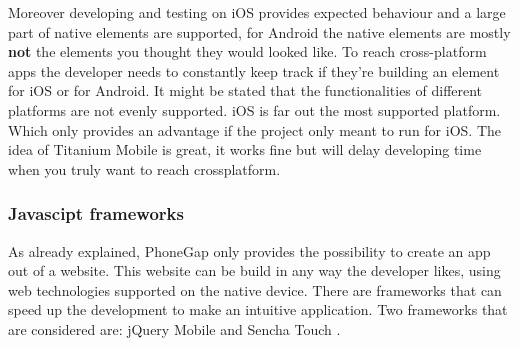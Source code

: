 Moreover developing and testing on iOS provides expected behaviour and a large part of native elements are supported, for Android the native elements are mostly \textbf{not} the elements you thought they would looked like. To reach cross-platform apps the developer needs to constantly keep track if they're building an element for iOS or for Android. It might be stated that the functionalities of different platforms are not evenly supported. iOS is far out the most supported platform. Which only provides an advantage if the project only meant to run for iOS. The idea of Titanium Mobile is great, it works fine but will delay developing time when you truly want to reach crossplatform.

\subsubsection*{Javascipt frameworks}
As already explained, PhoneGap only provides the possibility to create an app out of a website. This website can be build in any way the developer likes, using web technologies supported on the native device. There are frameworks that can speed up the development to make an intuitive application. Two frameworks that are considered are: jQuery Mobile \cite{jQuery-Mobile} and  Sencha Touch \cite{sencha}. 
